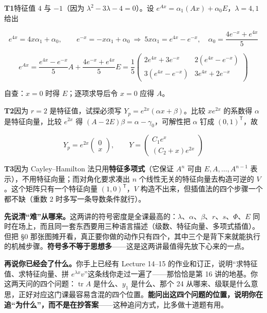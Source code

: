 \documentclass[11pt]{ctexart}
\newcommand{\hdr}[1]{%
  \par\vspace{9pt}%
  \noindent{\color{deepblue}\large\bfseries #1}\par\vspace{2pt}%
  \noindent{\color{deepblue}\rule{\linewidth}{1.1pt}}\par\vspace{5pt}}
\begin{document}
\hdr{§9\quad 自测答案}

\textbf{T1}\quad 特征值 $4$ 与 $-1$（因为 $\lambda^2-3\lambda-4=0$）。设 $e^{Ax}=\alpha_1(Ax)+\alpha_0E$，$\lambda=4,1$ 给出

\[
e^{4x}=4x\alpha_1+\alpha_0,\qquad e^{-x}=-x\alpha_1+\alpha_0
\ \Longrightarrow\ 5x\alpha_1=e^{4x}-e^{-x},\quad \alpha_0=\frac{4e^{-x}+e^{4x}}{5}
\]

\[
e^{Ax}=\frac{e^{4x}-e^{-x}}{5}A+\frac{4e^{-x}+e^{4x}}{5}E
=\frac{1}{5}\begin{pmatrix}2e^{4x}+3e^{-x} & 2(e^{4x}-e^{-x})\\[2pt] 3(e^{4x}-e^{-x}) & 3e^{4x}+2e^{-x}\end{pmatrix}
\]

自查：$x=0$ 时得 $E$；逐项求导后令 $x=0$ 应得 $A$。

\textbf{T2}\quad 因为 $r=2$ 是特征值，试探必须写 $Y_p=e^{2x}(\alpha x+\beta)$。比较 $xe^{2x}$ 的系数得 $\alpha$ 是特征向量，比较 $e^{2x}$ 得 $(A-2E)\beta=\alpha-\gamma_0$，可解性把 $\alpha$ 钉成 $(0,1)^{\mathsf T}$，故

\[
Y_p=e^{2x}\begin{pmatrix}0\\x\end{pmatrix},\qquad Y=\begin{pmatrix}C_1e^{x}\\ (C_2+x)e^{2x}\end{pmatrix}
\]

\textbf{T3}\quad 因为 Cayley--Hamilton 法只用\textbf{特征多项式}（它保证 $A^n$ 可由 $E,A,\dots,A^{n-1}$ 表示），不用特征向量；而对角化要求凑出 $n$ 个线性无关的特征向量去构造可逆的 $V$。这个矩阵只有一个特征向量 $(1,0)^{\mathsf T}$，$V$ 构造不出来，但插值法的四个步骤一个都不缺（重数 $2$ 时多写一条导数条件就行）。

\hdr{§10\quad 说点实在的}

\textbf{先说清“难”从哪来。}这两讲的符号密度是全课最高的：$\lambda$、$\alpha$、$\beta$、$r$、$s$、$\Phi$、$E$ 同时在场上，而且同一套东西要用三种语言描述（级数、特征向量、多项式插值）。但把 §0 那张图摊开看，真正要你做的动作只有四个，其中三个是背下来就能执行的机械步骤。\textbf{符号多不等于思想多}——这是这两讲最值得先放下心来的一点。

\textbf{再说你已经会了什么。}你手上已经有 Lecture 14--15 的作业和订正，说明“求特征值、求特征向量、拼 $e^{\lambda x}v$”这条线你走过一遍了——那恰恰是第 16 讲的地基。你这两天问的四个问题：$\operatorname{tr}A$ 是什么、$y_1$ 是什么、那个 24 从哪来、级联是什么意思，正好对应这门课最容易含混的四个位置。\textbf{能问出这四个问题的位置，说明你在追“为什么”，而不是在抄答案}——这种追问方式，比多做十道题有用。
\end{document}
